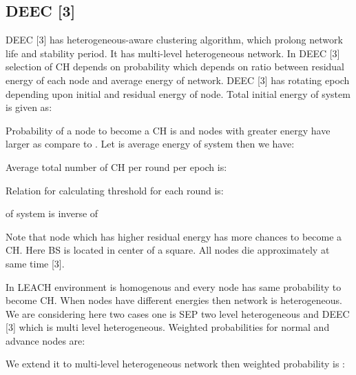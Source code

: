 \documentclass[10pt, conference, compsocconf]{IEEEtran}
\begin{document}
\subsection{DEEC [3]}
DEEC [3] has heterogeneous-aware clustering algorithm, which prolong network life and stability period. It has multi-level heterogeneous network. In DEEC [3] selection of CH depends on probability which depends on ratio between residual energy of each node and average energy of network. DEEC [3] has rotating epoch depending upon initial and residual energy of node. Total initial energy of system is given as:



Probability of a node to become a CH is  and nodes with greater energy have larger  as compare to . Let   is average energy of system then we have:



 Average total number of CH per round per epoch is:



Relation for calculating threshold for each round is:



 of system is inverse of 



Note that node which has higher residual energy has more chances to become a CH. Here BS is located in center of a square. All nodes die approximately at same time [3].

In LEACH environment is homogenous and every node has same probability to become CH. When nodes have different energies then network is heterogeneous. We are considering here two cases one is SEP two level heterogeneous and DEEC [3] which is multi level heterogeneous. Weighted probabilities for normal and advance nodes are:





We extend it to multi-level heterogeneous network then weighted probability is :
\end{document}
